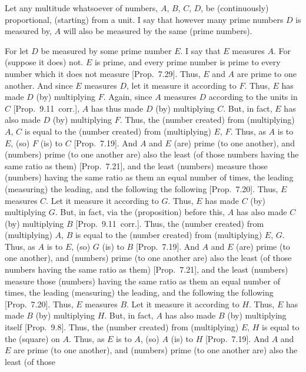 \epsfysize=1.1in
\centerline{}

Let any multitude whatsoever of numbers,  $A$, $B$, $C$, $D$, be (continuously) proportional, (starting) from a unit. I say that however many prime
numbers $D$ is measured by, $A$ will also be measured by the same
(prime numbers).

For let $D$ be measured by some prime number $E$. I say that $E$ measures $A$. For (suppose it does) not. $E$ is prime, and every prime number is prime to
every number which it does not measure [Prop.~7.29]. Thus, $E$ and $A$ are prime to one another. And since $E$ measures $D$, let it measure it according to $F$. 
Thus, $E$ has made $D$ (by) multiplying $F$.  Again, since $A$ measures $D$ according to the units in $C$ [Prop.~9.11~corr.],
$A$ has thus made $D$ (by) multiplying $C$. But, in fact, $E$ has also
made $D$ (by) multiplying $F$. Thus, the (number created) from (multiplying)
$A$, $C$ is equal to  the (number created) from (multiplying) $E$, $F$.
Thus, as $A$ is to $E$, (so) $F$ (is) to $C$ [Prop.~7.19]. And $A$ and $E$ (are)  prime (to one another), and (numbers) prime (to one another are) also the least (of those
numbers having the same ratio as them) [Prop.~7.21],
and the least (numbers) measure those (numbers) having the same ratio as them an equal number of times, the leading (measuring) the leading, and the
following the following [Prop.~7.20]. Thus, $E$
measures $C$. Let it measure it according to $G$. Thus, $E$ has made $C$
(by) multiplying $G$. But, in fact, via the (proposition) before this, $A$
has also made $C$ (by) multiplying $B$ [Prop.~9.11~corr.].
 Thus, the (number created) from (multiplying) $A$, $B$ is equal to the
 (number created) from (multiplying) $E$, $G$. Thus, as $A$ is to $E$, (so) $G$ (is) to $B$ [Prop.~7.19]. And $A$ and $E$
 (are) prime (to one another), and (numbers) prime (to one another are) also the least (of those
numbers having the same ratio as them) [Prop.~7.21],
and the least (numbers) measure those (numbers) having the same ratio as them an equal number of times, the leading (measuring) the leading, and the
following the following [Prop.~7.20]. Thus, $E$
measures $B$. Let it measure it according to $H$. Thus, $E$ has made $B$ (by) multiplying $H$. But, in fact, $A$ has also made $B$
(by) multiplying itself [Prop.~9.8].  Thus, the (number created) from (multiplying) $E$, $H$ is equal to the (square) on $A$.
Thus, as $E$ is to $A$, (so) $A$ (is) to $H$ [Prop.~7.19]. And $A$ and $E$
 are prime (to one another), and (numbers) prime (to one another are) also the least (of those
